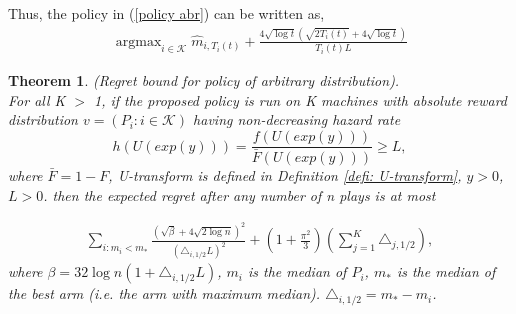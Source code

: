 \documentclass{article}
\DeclareMathOperator*{\argmax}{argmax}
\theoremstyle{plain}
\newtheorem{theo}{Theorem}
\begin{document}
Thus, the policy in (\ref{policy abr}) can be written as,
\begin{align}
    \argmax_{i \in \mathcal{K}} \hat{m}_{i, T_i(t)} +  \frac{4 \sqrt{\log t} ( \sqrt{ 2T_i(t)} + 4\sqrt{\log t})}{T_i(t) L}
\end{align}

\begin{theo}
(Regret bound for policy of arbitrary distribution). \\

For all K $>$ 1, if the proposed policy is run on K machines with absolute reward distribution $v = (P_i: i \in \mathcal{K})$ having non-decreasing hazard rate $$h\left(U(exp(y))\right) = \frac{f\left(U(exp(y))\right)}{\bar{F}\left(U(exp(y))\right) } \geq L,$$
where $\bar{F} = 1 - F$, U-transform is defined in Definition \ref{defi: U-transform}, $y > 0$, $L > 0$.  then the expected regret after any number of n plays is at most

\begin{align}
    \sum_{i: m_i < m_\ast} \frac{(\sqrt{\beta} + 4\sqrt{2\log n})^2}{ (\triangle_{i, 1/2} L)^2} + (1 + \frac{\pi^2}{3}) (\sum_{j=1}^K \triangle_{j, 1/2}),
\end{align}
where $\beta = 32 \log n (1 + \triangle_{i, 1/2} L)$, $m_i$ is the median of $P_i$, $m_\ast$ is the median of the best arm (i.e. the arm with maximum median). $\triangle_{i, 1/2} = m_\ast - m_i$.
\end{theo}
\end{document}
